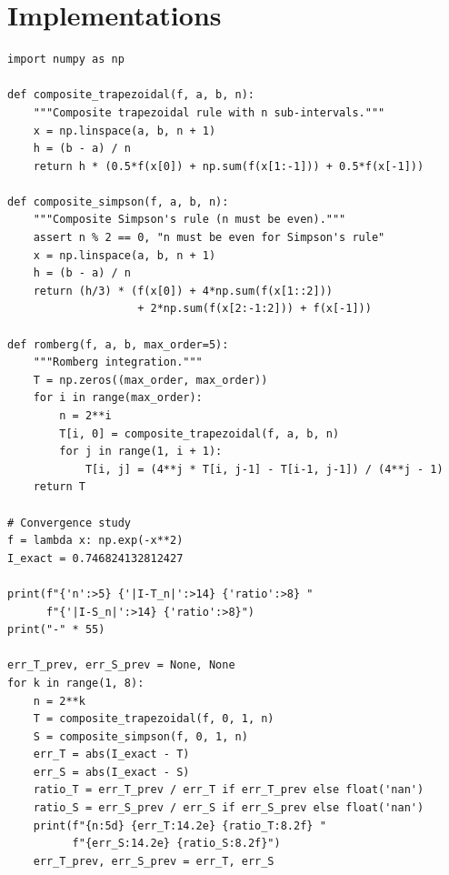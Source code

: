 \section{Implementations}

\begin{codeblock}[title=\textbf{Python --- Numerical integration}]
\begin{verbatim}
import numpy as np

def composite_trapezoidal(f, a, b, n):
    """Composite trapezoidal rule with n sub-intervals."""
    x = np.linspace(a, b, n + 1)
    h = (b - a) / n
    return h * (0.5*f(x[0]) + np.sum(f(x[1:-1])) + 0.5*f(x[-1]))

def composite_simpson(f, a, b, n):
    """Composite Simpson's rule (n must be even)."""
    assert n % 2 == 0, "n must be even for Simpson's rule"
    x = np.linspace(a, b, n + 1)
    h = (b - a) / n
    return (h/3) * (f(x[0]) + 4*np.sum(f(x[1::2]))
                    + 2*np.sum(f(x[2:-1:2])) + f(x[-1]))

def romberg(f, a, b, max_order=5):
    """Romberg integration."""
    T = np.zeros((max_order, max_order))
    for i in range(max_order):
        n = 2**i
        T[i, 0] = composite_trapezoidal(f, a, b, n)
        for j in range(1, i + 1):
            T[i, j] = (4**j * T[i, j-1] - T[i-1, j-1]) / (4**j - 1)
    return T

# Convergence study
f = lambda x: np.exp(-x**2)
I_exact = 0.746824132812427

print(f"{'n':>5} {'|I-T_n|':>14} {'ratio':>8} "
      f"{'|I-S_n|':>14} {'ratio':>8}")
print("-" * 55)

err_T_prev, err_S_prev = None, None
for k in range(1, 8):
    n = 2**k
    T = composite_trapezoidal(f, 0, 1, n)
    S = composite_simpson(f, 0, 1, n)
    err_T = abs(I_exact - T)
    err_S = abs(I_exact - S)
    ratio_T = err_T_prev / err_T if err_T_prev else float('nan')
    ratio_S = err_S_prev / err_S if err_S_prev else float('nan')
    print(f"{n:5d} {err_T:14.2e} {ratio_T:8.2f} "
          f"{err_S:14.2e} {ratio_S:8.2f}")
    err_T_prev, err_S_prev = err_T, err_S
\end{verbatim}
\end{codeblock}

